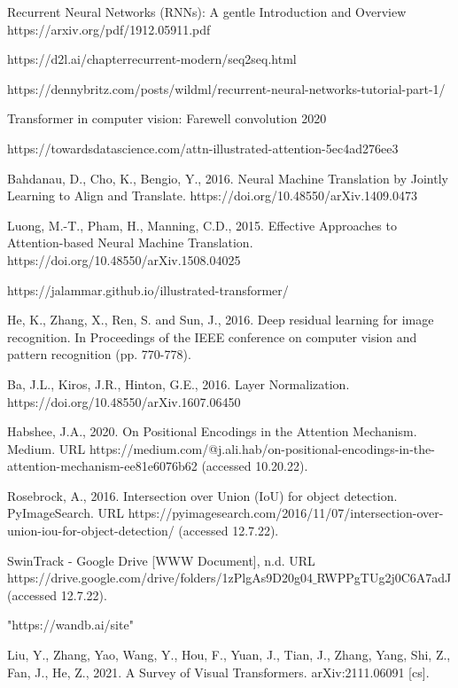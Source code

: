 \begin{thebibliography}{ widest-label }
	Recurrent Neural Networks (RNNs): A gentle Introduction and Overview https://arxiv.org/pdf/1912.05911.pdf
	
	https://d2l.ai/chapterrecurrent-modern/seq2seq.html
	
	https://dennybritz.com/posts/wildml/recurrent-neural-networks-tutorial-part-1/
	
	Transformer in computer vision: Farewell convolution 2020
	
	https://towardsdatascience.com/attn-illustrated-attention-5ec4ad276ee3
	
	Bahdanau, D., Cho, K., Bengio, Y., 2016. Neural Machine Translation by Jointly Learning to Align and Translate. https://doi.org/10.48550/arXiv.1409.0473
	
	Luong, M.-T., Pham, H., Manning, C.D., 2015. Effective Approaches to Attention-based Neural Machine Translation. https://doi.org/10.48550/arXiv.1508.04025
	
	https://jalammar.github.io/illustrated-transformer/
	
	He, K., Zhang, X., Ren, S. and Sun, J., 2016. Deep residual learning for image recognition. In Proceedings of the IEEE conference on computer vision and pattern recognition (pp. 770-778).
	
	Ba, J.L., Kiros, J.R., Hinton, G.E., 2016. Layer Normalization. https://doi.org/10.48550/arXiv.1607.06450
	
	Habshee, J.A., 2020. On Positional Encodings in the Attention Mechanism. Medium. URL https://medium.com/@j.ali.hab/on-positional-encodings-in-the-attention-mechanism-ee81e6076b62 (accessed 10.20.22).
	
	Rosebrock, A., 2016. Intersection over Union (IoU) for object detection. PyImageSearch. URL https://pyimagesearch.com/2016/11/07/intersection-over-union-iou-for-object-detection/ (accessed 12.7.22).
	
	SwinTrack - Google Drive [WWW Document], n.d. URL https://drive.google.com/drive/folders/1zPlgAs9D20g04$\_$RWPPgTUg2j0C6A7adJ (accessed 12.7.22).
	
	"https://wandb.ai/site"
	
	Liu, Y., Zhang, Yao, Wang, Y., Hou, F., Yuan, J., Tian, J., Zhang, Yang, Shi, Z., Fan, J., He, Z., 2021. A Survey of Visual Transformers. arXiv:2111.06091 [cs].
	

\end{thebibliography}
